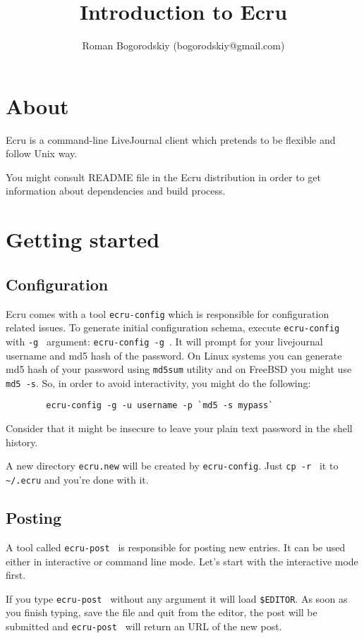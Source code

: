 \documentclass{article}
\title{Introduction to Ecru}
\author{Roman Bogorodskiy (bogorodskiy@gmail.com)}
\date{}
\begin{document}
   \maketitle
   \tableofcontents
   \section{About}
    Ecru is a command-line LiveJournal client which pretends to be flexible
    and follow Unix way.
 
    You might consult README file in the Ecru distribution in order to get
    information about dependencies and build process.

    \section{Getting started}
      \subsection{Configuration}
       Ecru comes with a tool {\tt ecru-config} which is responsible for
       configuration related issues. To generate initial configuration schema,
       execute {\tt ecru-config } with {\tt -g } argument: { \tt ecru-config -g }. It
       will prompt for your livejournal username and md5 hash of the password.
       On Linux systems you can generate md5 hash of your password using
       {\tt md5sum} utility and on FreeBSD you might use {\tt md5 -s}. So, in order
       to avoid interactivity, you might do the following:
  
	\begin{verbatim}
		ecru-config -g -u username -p `md5 -s mypass`
	\end{verbatim}
	
	Consider that it might be insecure to leave your plain text password in the
	shell history.

	A new directory {\tt ecru.new} will be created by {\tt ecru-config}. Just 
	{\tt cp -r } it to {\tt \verb+~+/.ecru} and you're done with it.
       \subsection{Posting}
	A tool called {\tt ecru-post } is responsible for posting new entries. It can be used
	either in interactive or command line mode. Let's start with the interactive mode first.

	If you type {\tt ecru-post } without any argument it will load {\tt \$EDITOR}. As soon as you
	finish typing, save the file and quit from the editor, the post will be submitted and
	{\tt ecru-post } will return an URL of the new post.
\end{document}
